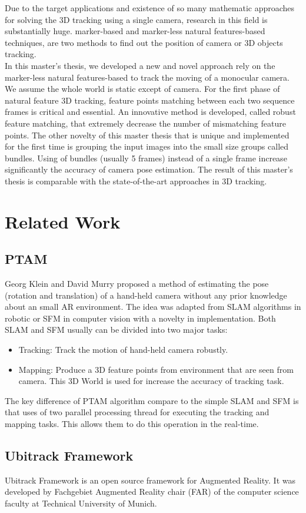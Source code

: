 Due to the target applications and existence of so many mathematic approaches for solving the 3D tracking using a single camera, research in this field is substantially huge. marker-based and marker-less natural features-based techniques, are two methods to find out the position of camera or 3D objects tracking.\\
In this master's thesis, we developed a new and novel approach rely on the marker-less natural features-based to track the moving of a monocular camera. We assume the whole world is static except of camera. For the first phase of natural feature 3D tracking, feature points matching between each two sequence frames is critical and essential. An innovative method is developed, called robust feature matching, that extremely decrease the number of mismatching feature points. The other novelty of this master thesis that is unique and implemented for the first time is grouping the input images into the small size groups called bundles. Using of bundles (usually 5 frames) instead of a single frame increase significantly the accuracy of camera pose estimation. The result of this master's thesis is comparable with the state-of-the-art approaches in 3D tracking.\\

\section{Related Work}
\subsection{PTAM}
Georg Klein and David Murry \cite{klein2007parallel} proposed a method of estimating the pose (rotation and translation) of a hand-held camera without any prior knowledge about an small AR environment. The idea was adapted from SLAM algorithms in robotic or SFM in computer vision with a novelty in implementation. Both SLAM and SFM usually can be divided into two major tasks:
\begin{itemize}
\item Tracking: Track the motion of hand-held camera robustly.
\item Mapping: Produce a 3D feature points from environment that are seen from camera. This 3D World is used for increase the accuracy of tracking task.
\end{itemize}
The key difference of PTAM algorithm compare to the simple SLAM and SFM is that uses of two parallel processing thread for executing the tracking and mapping tasks. This allows them to do this operation in the real-time.\\

\subsection{Ubitrack Framework}
Ubitrack Framework is an open source framework for Augmented Reality. It was developed by Fachgebiet Augmented Reality chair (FAR) of the computer science faculty at Technical University of Munich.

